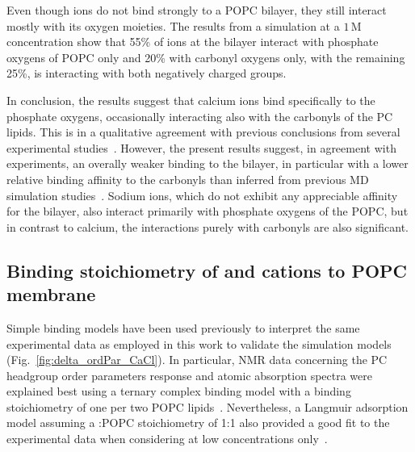 Even though  ions do not bind strongly to a POPC bilayer, they still interact mostly with its oxygen moieties. The results from a simulation at a $1\,$M  concentration show that 55\% of  ions at the bilayer interact with phosphate oxygens of POPC only and 20\% with carbonyl oxygens only, with the remaining 25\%, is interacting with both negatively charged groups. 
 
In conclusion, the results suggest that calcium ions bind specifically to the phosphate oxygens, occasionally interacting also with the carbonyls of the PC lipids. This is in a qualitative agreement with previous conclusions from several experimental studies~\citep{hauser76, hauser78, herbette84, cevc90, binder02}. However, the present results suggest, in 
agreement with experiments, an overally weaker binding to the bilayer, in particular with a lower relative binding affinity to the carbonyls than inferred from previous MD simulation studies~\citep{bockmann03, bockmann04, melcrova16, javanainen17}. Sodium ions, which do not exhibit any appreciable affinity for the bilayer, also interact primarily with phosphate oxygens of the POPC, but in contrast to calcium, the interactions purely with carbonyls are also significant. 
 
 
\subsection{Binding stoichiometry of  and  cations to POPC membrane} 
Simple binding models have been used previously to interpret the same experimental data \citep{altenbach84,macdonald87} as employed in this work to validate the simulation models (Fig.~\ref{fig:delta_ordPar_CaCl}). In particular, NMR data concerning the PC headgroup order parameters response and atomic absorption spectra were explained best using a ternary complex binding model with a binding stoichiometry of one  per two POPC lipids~\citep{altenbach84}. Nevertheless, a Langmuir adsorption model assuming a :POPC stoichiometry of 1:1 also provided a good fit to the experimental data when considering  at low concentrations only~\citep{macdonald87}. 
 
